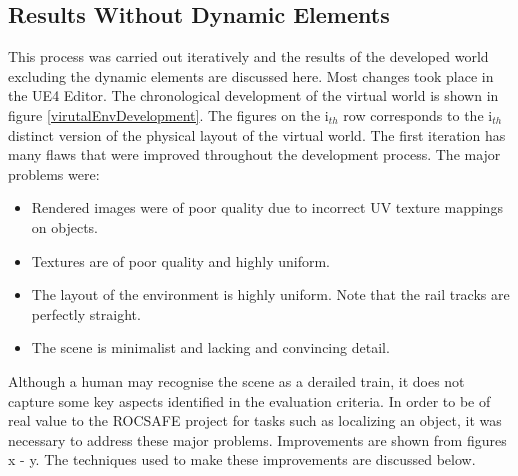 \subsection{Results Without Dynamic Elements}
This process was carried out iteratively and the results of the developed world excluding the dynamic elements are discussed here. Most changes took place in the UE4 Editor. The chronological development of the virtual world is shown in figure \ref{virutalEnvDevelopment}. The figures on the i$_{th}$ row corresponds to the i$_{th}$ distinct version of the physical layout of the virtual world. The first iteration has many flaws that were improved throughout the development process. The major problems were:
\begin{itemize}
    \item Rendered images were of poor quality due to incorrect UV texture mappings %
    on objects.
    \item Textures are of poor quality and highly uniform.
    \item The layout of the environment is highly uniform. Note that the rail tracks are perfectly straight.
    \item The scene is minimalist and lacking and convincing detail.
\end{itemize}
Although a human may recognise the scene as a derailed train, it does not capture some key aspects identified in the evaluation criteria. In order to be of real value to the ROCSAFE project for tasks such as localizing an object, it was necessary to address these major problems. Improvements are shown from figures x - y. The techniques used to make these improvements are discussed below.



